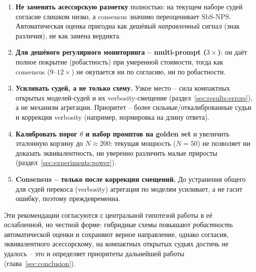 \begin{enumerate}
    \item \textbf{Не заменять асессорскую разметку} полностью: на текущем
        наборе судей согласие слишком низко, а consensus значимо
        переоценивает $\mathrm{SbS\text{-}NPS}$. Автоматическая оценка
        пригодна как дешёвый \emph{направленный} сигнал (знак различия), не
        как замена вердикта.
    \item \textbf{Для дешёвого регулярного мониторинга -- multi-prompt
        ($3\times$)}: он даёт полное покрытие (робастность) при умеренной
        стоимости, тогда как consensus ($9$--$12\times$) не окупается ни по
        согласию, ни по робастности.
    \item \textbf{Усиливать судей, а не только схему.} Узкое место --
        сила компактных открытых моделей-судей и их verbosity-смещение
        (раздел~\ref{sec:results:errors}), а не механизм агрегации.
        Приоритет -- более сильные/откалиброванные судьи и коррекция
        verbosity (например, нормировка на длину ответа).
    \item \textbf{Калибровать порог $\theta$ и набор промптов на golden
        set} и увеличить эталонную корзину до $N \approx 200$: текущая
        мощность ($N = 50$) не позволяет ни доказать эквивалентность, ни
        уверенно различить малые приросты
        (раздел~\ref{sec:experiments:power}).
    \item \textbf{Consensus -- только после коррекции смещений.} До
        устранения общего для судей перекоса (verbosity) агрегация по
        моделям усиливает, а не гасит ошибку, поэтому преждевременна.
\end{enumerate}

Эти рекомендации согласуются с центральной гипотезой работы в её
ослабленной, но честной форме: гибридные схемы повышают \emph{робастность}
автоматической оценки и сохраняют верное направление, однако согласия,
эквивалентного асессорскому, на компактных открытых судьях достичь не
удалось -- это и определяет приоритеты дальнейшей работы
(глава~\ref{sec:conclusion}).
